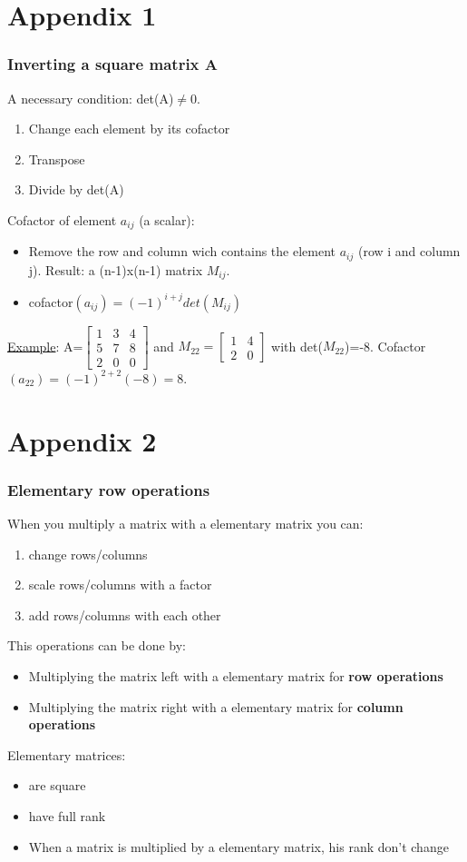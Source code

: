\section{Appendix 1}

\begin{frame}
	\frametitle{Inverting a square matrix A}
		A necessary condition: det(A)$\neq$0.
		\begin{enumerate}
			\item Change each element by its cofactor
			\item Transpose
			\item Divide by det(A) 
		\end{enumerate}
		Cofactor of element $a_{ij}$ (a scalar):
		\begin{itemize}
			\item Remove the row and column wich contains the element $a_{ij}$ (row i and column j). Result: a (n-1)x(n-1) matrix $M_{ij}$.
			\item cofactor$(a_{ij})=(-1)^{i+j}det(M_{ij})$
		\end{itemize}
		\underline{Example}: A=$\begin{bmatrix} 1 & 3& 4\\
		5 & 7 & 8\\
		2 & 0 & 0 \end{bmatrix}$ and $M_{22}=\begin{bmatrix}
		1 & 4\\
		2 & 0
		\end{bmatrix}$ with det($M_{22}$)=-8. Cofactor$(a_{22})=(-1)^{2+2}(-8)=8$.
\end{frame}

\section{Appendix 2}

\begin{frame}
	\frametitle{Elementary row operations}
	When you multiply a matrix with a elementary matrix you can:
	\begin{enumerate}
		\item change rows/columns  
		\item scale rows/columns with a factor
		\item add rows/columns with each other
	\end{enumerate}
	This operations can be done by:
	\begin{itemize}
	\item Multiplying the matrix left with a elementary matrix for \textbf{row operations}
	\item Multiplying the matrix right with a elementary matrix for \textbf{column operations}
	\end{itemize}
	Elementary matrices:
	\begin{itemize}
	\item are square \\
	\item have full rank\\
	\item When a matrix is multiplied by a elementary matrix, his rank don't change
	\end{itemize}
\end{frame}

